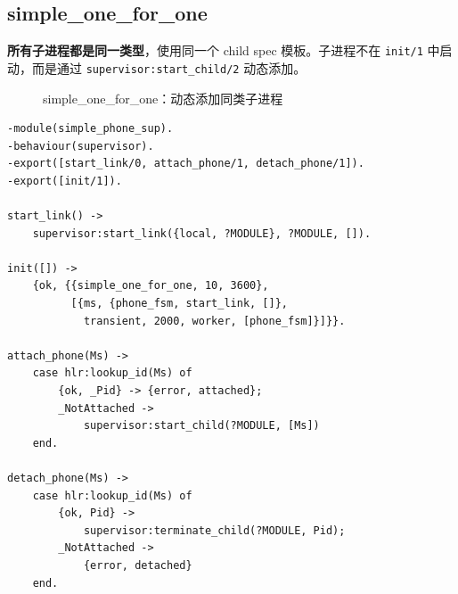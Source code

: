 \documentclass[a4paper,11pt]{article}
\begin{document}
\subsection{simple\_one\_for\_one}

\textbf{所有子进程都是同一类型}，使用同一个 child spec 模板。子进程不在 \texttt{init/1} 中启动，而是通过 \texttt{supervisor:start\_child/2} 动态添加。

\begin{figure}[H]
\centering
{}
\caption{simple\_one\_for\_one：动态添加同类子进程}
\end{figure}

\begin{lstlisting}[style=erlangstyle, caption={simple\_one\_for\_one 示例：simple\_phone\_sup.erl}]
-module(simple_phone_sup).
-behaviour(supervisor).
-export([start_link/0, attach_phone/1, detach_phone/1]).
-export([init/1]).

start_link() ->
    supervisor:start_link({local, ?MODULE}, ?MODULE, []).

init([]) ->
    {ok, {{simple_one_for_one, 10, 3600},
          [{ms, {phone_fsm, start_link, []},
            transient, 2000, worker, [phone_fsm]}]}}.

attach_phone(Ms) ->
    case hlr:lookup_id(Ms) of
        {ok, _Pid} -> {error, attached};
        _NotAttached ->
            supervisor:start_child(?MODULE, [Ms])
    end.

detach_phone(Ms) ->
    case hlr:lookup_id(Ms) of
        {ok, Pid} ->
            supervisor:terminate_child(?MODULE, Pid);
        _NotAttached ->
            {error, detached}
    end.
\end{lstlisting}
\end{document}
